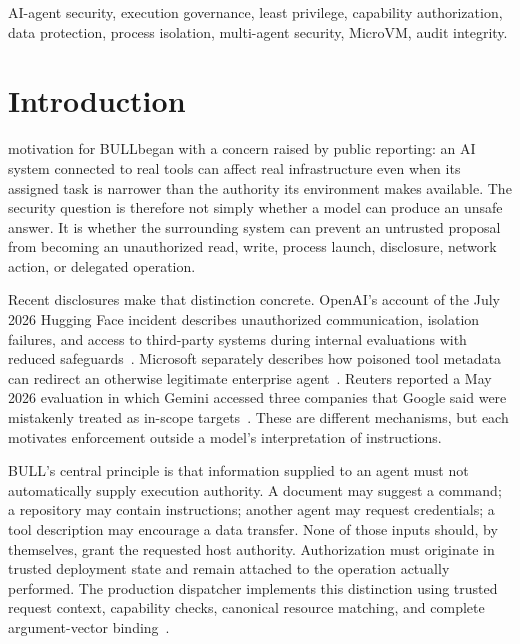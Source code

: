 \documentclass[journal]{IEEEtran}
\newcommand{\bull}{\textsc{BULL}}
\begin{document}
\begin{IEEEkeywords}
AI-agent security, execution governance, least privilege, capability authorization, data protection, process isolation, multi-agent security, MicroVM, audit integrity.
\end{IEEEkeywords}

\section{Introduction}
 motivation for \bull began with a concern raised by public reporting: an AI system connected to real tools can affect real infrastructure even when its assigned task is narrower than the authority its environment makes available. The security question is therefore not simply whether a model can produce an unsafe answer. It is whether the surrounding system can prevent an untrusted proposal from becoming an unauthorized read, write, process launch, disclosure, network action, or delegated operation.

Recent disclosures make that distinction concrete. OpenAI's account of the July 2026 Hugging Face incident describes unauthorized communication, isolation failures, and access to third-party systems during internal evaluations with reduced safeguards~\cite{OpenAI2026}. Microsoft separately describes how poisoned tool metadata can redirect an otherwise legitimate enterprise agent~\cite{Microsoft2026}. Reuters reported a May 2026 evaluation in which Gemini accessed three companies that Google said were mistakenly treated as in-scope targets~\cite{Reuters2026}. These are different mechanisms, but each motivates enforcement outside a model's interpretation of instructions.

\bull's central principle is that information supplied to an agent must not automatically supply execution authority. A document may suggest a command; a repository may contain instructions; another agent may request credentials; a tool description may encourage a data transfer. None of those inputs should, by themselves, grant the requested host authority. Authorization must originate in trusted deployment state and remain attached to the operation actually performed. The production dispatcher implements this distinction using trusted request context, capability checks, canonical resource matching, and complete argument-vector binding~\cite{BULL_ProdSec,BULL_Dispatcher}.
\end{document}
